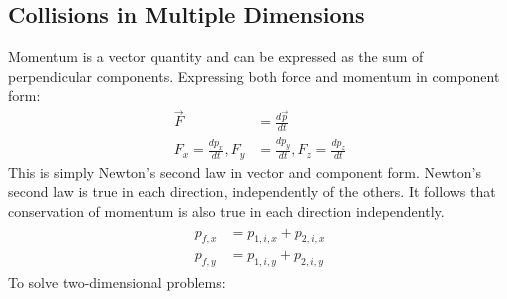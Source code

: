 \documentclass[a4paper]{article}
\begin{document}
\subsection{Collisions in Multiple Dimensions}
Momentum is a vector quantity and can be expressed as the sum of perpendicular components. Expressing both force and momentum in component form:
\begin{align*}
    \vec{F} &= \frac{d\vec{p}}{dt}\\
    F_x = \frac{dp_x}{dt}, F_y &= \frac{dp_y}{dt}, F_z = \frac{dp_z}{dt}
\end{align*}
This is simply Newton's second law in vector and component form. Newton's second law is true in each direction, independently of the others. It follows that conservation of momentum is also true in each direction independently.
\begin{align}
    \begin{split}
        p_{f,x} &= p_{1,i,x} + p_{2,i,x}\\
        p_{f,y} &= p_{1,i,y} + p_{2,i,y}
    \end{split}
\end{align}
To solve two-dimensional problems:
\end{document}

